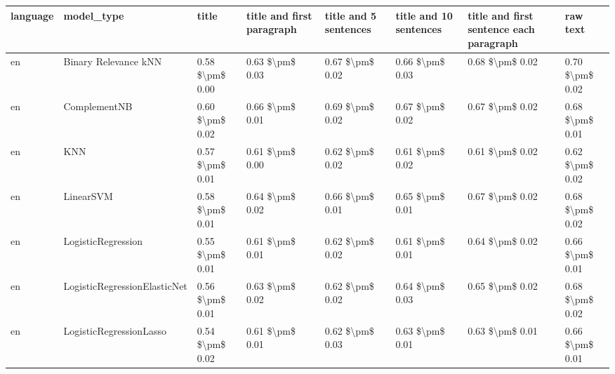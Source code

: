\begin{tabular}{llllllll}
\toprule
language &                      model\_type &           title & title and first paragraph & title and 5 sentences & title and 10 sentences & title and first sentence each paragraph &            raw text \\
\midrule
      en &            Binary Relevance kNN & 0.58 \$\textbackslash pm\$ 0.00 &           0.63 \$\textbackslash pm\$ 0.03 &       0.67 \$\textbackslash pm\$ 0.02 &        0.66 \$\textbackslash pm\$ 0.03 &                         0.68 \$\textbackslash pm\$ 0.02 &     0.70 \$\textbackslash pm\$ 0.02 \\
      en &                    ComplementNB & 0.60 \$\textbackslash pm\$ 0.02 &           0.66 \$\textbackslash pm\$ 0.01 &       0.69 \$\textbackslash pm\$ 0.02 &        0.67 \$\textbackslash pm\$ 0.02 &                         0.67 \$\textbackslash pm\$ 0.02 &     0.68 \$\textbackslash pm\$ 0.01 \\
      en &                             KNN & 0.57 \$\textbackslash pm\$ 0.01 &           0.61 \$\textbackslash pm\$ 0.00 &       0.62 \$\textbackslash pm\$ 0.02 &        0.61 \$\textbackslash pm\$ 0.02 &                         0.61 \$\textbackslash pm\$ 0.02 &     0.62 \$\textbackslash pm\$ 0.02 \\
      en &                       LinearSVM & 0.58 \$\textbackslash pm\$ 0.01 &           0.64 \$\textbackslash pm\$ 0.02 &       0.66 \$\textbackslash pm\$ 0.01 &        0.65 \$\textbackslash pm\$ 0.01 &                         0.67 \$\textbackslash pm\$ 0.02 &     0.68 \$\textbackslash pm\$ 0.02 \\
      en &              LogisticRegression & 0.55 \$\textbackslash pm\$ 0.01 &           0.61 \$\textbackslash pm\$ 0.01 &       0.62 \$\textbackslash pm\$ 0.02 &        0.61 \$\textbackslash pm\$ 0.01 &                         0.64 \$\textbackslash pm\$ 0.02 &     0.66 \$\textbackslash pm\$ 0.01 \\
      en &    LogisticRegressionElasticNet & 0.56 \$\textbackslash pm\$ 0.01 &           0.63 \$\textbackslash pm\$ 0.02 &       0.62 \$\textbackslash pm\$ 0.02 &        0.64 \$\textbackslash pm\$ 0.03 &                         0.65 \$\textbackslash pm\$ 0.02 &     0.68 \$\textbackslash pm\$ 0.02 \\
      en &         LogisticRegressionLasso & 0.54 \$\textbackslash pm\$ 0.02 &           0.61 \$\textbackslash pm\$ 0.01 &       0.62 \$\textbackslash pm\$ 0.03 &        0.63 \$\textbackslash pm\$ 0.01 &                         0.63 \$\textbackslash pm\$ 0.01 &     0.66 \$\textbackslash pm\$ 0.01 \\

\end{tabular}

